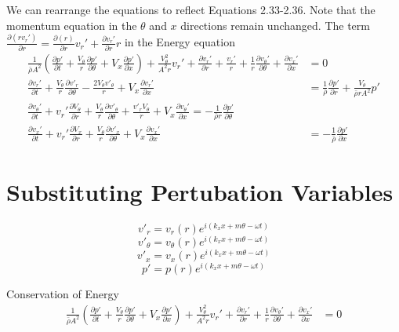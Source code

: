 We can rearrange the equations to reflect Equations 2.33-2.36. Note that the momentum equation in the $\theta$ and $x$ directions remain unchanged. The term $ \frac{\partial(rv_r')}{\partial r}  = \frac{\partial (r)}{\partial r}v_r' + \frac{\partial v_r'}{\partial r} r$ in the Energy equation
\begin{align*}
\frac{1}{\bar{\rho} A^2}\left(
\frac{\partial p'}{\partial t} +
\frac{V_{\theta}}{r}
\frac{\partial p'}{\partial \theta} + 
V_x
\frac{\partial p'}{\partial x}
\right) +
\frac{V_{\theta}^2}{A^2 r}v_r'+
\frac{\partial v_r'}{\partial r} + \frac{v_r'}{r} +
\frac{1}{r}
\frac{\partial v_{\theta}'}{\partial \theta}		 
 +
\frac{\partial v_x'}{\partial x}
&= 0\\
\frac{\partial  v_r' }{\partial t} +
\frac{V_{\theta}}{r} \frac{\partial v'_r}{\partial \theta} -
\frac{2V_{\theta}v'_{\theta}}{r} +
V_x \frac{\partial v_r'}{\partial x} &= \frac{1}{\bar{\rho}} \frac{\partial p'}{\partial r}+\frac{V_{\theta}}{\bar{\rho} r A^2}   p'
\\
\frac{\partial  v_{\theta}' }{\partial t} +
v_r' \frac{\partial  V_{\theta}  }{\partial r} +
\frac{V_{\theta}}{r} \frac{\partial v'_{\theta}}{\partial \theta} +
\frac{v'_rV_{\theta}}{r} +
V_x \frac{\partial v_{\theta}'}{\partial x} 
= -\frac{1}{\bar{\rho} r}	\frac{\partial p'}{\partial \theta}\\
\frac{\partial  v_x' }{\partial t} +
v_r' \frac{\partial  V_x  }{\partial r} +
\frac{V_{\theta}}{r} \frac{\partial v'_x}{\partial \theta} +
V_x \frac{\partial v_x'}{\partial x} 
&= -\frac{1    }{\bar{\rho}}  \frac{\partial p'}{\partial x} 	
\end{align*}

\newpage
\section{Substituting Pertubation Variables}
\[v'_r = v_r (r) e^{i\left(k_x x + m \theta - \omega t \right)} \]
\[v'_{\theta} = v_{\theta} (r) e^{i\left(k_x x + m \theta - \omega t \right)} \]	
\[v'_x = v_x (r) e^{i\left(k_x x + m \theta - \omega t\right)} \]	
\[p' = p(r) e^{i\left(k_x x + m \theta - \omega t\right)} \]	

Conservation of Energy
\begin{align*}
\frac{1}{\bar{\rho} A^2}\left(
\frac{\partial p'}{\partial t} +
\frac{V_{\theta}}{r}
\frac{\partial p'}{\partial \theta} + 
V_x
\frac{\partial p'}{\partial x}
\right) +
\frac{V_{\theta}^2}{A^2 r}v_r'+
\frac{\partial v_r'}{\partial r} + 
\frac{1}{r}
\frac{\partial v_{\theta}'}{\partial \theta}		 
+
\frac{\partial v_x'}{\partial x}
&= 0
\end{align*}


